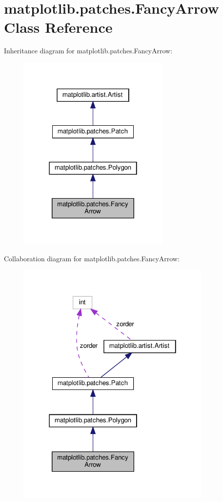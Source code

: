 \hypertarget{classmatplotlib_1_1patches_1_1FancyArrow}{}\section{matplotlib.\+patches.\+Fancy\+Arrow Class Reference}
\label{classmatplotlib_1_1patches_1_1FancyArrow}


Inheritance diagram for matplotlib.\+patches.\+Fancy\+Arrow\+:
\nopagebreak
\begin{figure}[H]
\begin{center}
\leavevmode
\includegraphics[width=214pt]{classmatplotlib_1_1patches_1_1FancyArrow__inherit__graph}
\end{center}
\end{figure}


Collaboration diagram for matplotlib.\+patches.\+Fancy\+Arrow\+:
\nopagebreak
\begin{figure}[H]
\begin{center}
\leavevmode
\includegraphics[width=274pt]{classmatplotlib_1_1patches_1_1FancyArrow__coll__graph}
\end{center}
\end{figure}
